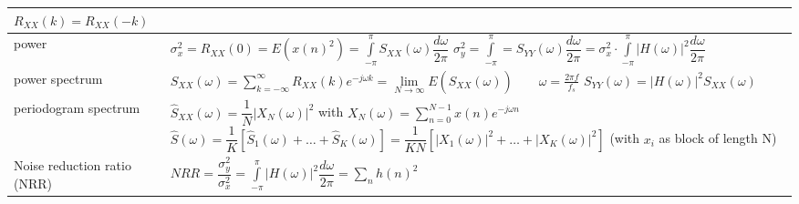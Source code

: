 \begin{tabularx}{\linewidth}{|l|X|}
	$R_{XX}(k) = R_{XX}(-k)$
	\\ \hline
  power &
  $\sigma_x^2 = R_{XX}(0) = E(x(n)^2) = \int\limits_{-\pi}^\pi S_{XX}(\omega)\dfrac{d\omega}{2\pi}$ \newline
  $\sigma_y^2 = \int\limits_{-\pi}^\pi = S_{YY}(\omega)\dfrac{d\omega}{2\pi} = 
  \sigma_x^2 \cdot \int\limits_{-\pi}^\pi |H(\omega)|^2 \dfrac{d\omega}{2\pi}$
	\\ \hline
	power spectrum & 
	$S_{XX}(\omega) = \sum\limits_{k=-\infty}^{\infty} R_{XX}(k)e^{-j\omega k} = \lim\limits_{N \rightarrow \infty}
	E(\hat{S}_{XX}(\omega))
  \qquad \omega = \frac{2\pi f}{f_s} $ \newline
  $S_{YY}(\omega) = |H(\omega)|^2 S_{XX}(\omega)$
	\\ \hline
  periodogram spectrum & $\hat{S}_{XX}(\omega)=\dfrac{1}{N}|X_N(\omega)|^2$ \qquad with
  $X_N(\omega) = \sum\limits_{n=0}^{N-1}x(n)e^{-j\omega n} $ \newline
  $\hat{S}(\omega) = \dfrac{1}{K}[\hat{S}_1(\omega) + \ldots + \hat{S}_K(\omega)] = 
  \dfrac{1}{KN}[|X_1(\omega)|^2 + \ldots + |X_K(\omega)|^2]$ \newline (with $x_i$ as block of length N)
	\\ \hline	
	Noise reduction ratio (NRR) &
	$NRR = \dfrac{\sigma_y^2}{\sigma_x^2} = \int\limits_{-\pi}^\pi |H(\omega)|^2 \dfrac{d\omega}{2\pi}
	= \sum\limits_{n} h(n)^2$
	\\ \hline
\end{tabularx}